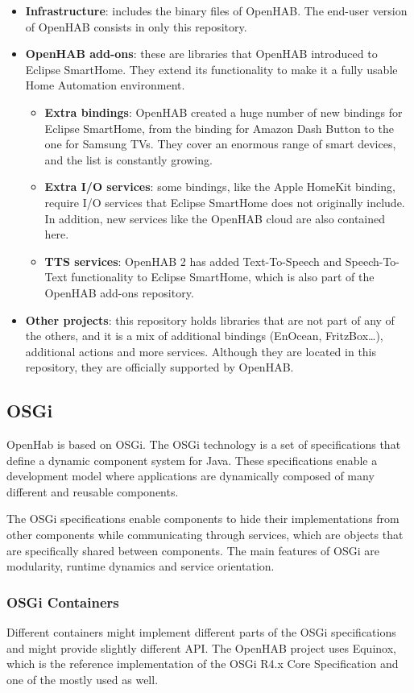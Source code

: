 \begin{itemize}
\begin{itemize}
	\end{itemize}
	\item \textbf{Infrastructure}: includes the binary files of OpenHAB. The end-user version of OpenHAB consists in only this repository.
	\item \textbf{OpenHAB add-ons}: these are libraries that OpenHAB introduced to Eclipse SmartHome. They extend its functionality to
	make it a fully usable Home Automation environment.
	\begin{itemize}
		\item \textbf{Extra bindings}: OpenHAB created a huge number of new bindings for Eclipse SmartHome, from the binding for
		Amazon Dash Button to the one for Samsung TVs. They cover an enormous range of smart devices, and the list is constantly growing.
		\item \textbf{Extra I/O services}: some bindings, like the Apple HomeKit binding, require I/O services that Eclipse SmartHome
		does not originally include. In addition, new services like the OpenHAB cloud are also contained here.
		\item \textbf{TTS services}: OpenHAB 2 has added Text-To-Speech and Speech-To-Text functionality to Eclipse SmartHome, which is
		also part of the OpenHAB add-ons repository.
	\end{itemize}
	\item \textbf{Other projects}: this repository holds libraries that are not part of any of the others, and it is a mix of additional bindings
	(EnOcean, FritzBox…), additional actions and more services. Although they are located in this repository, they are officially supported
	by OpenHAB.
\end{itemize}

\subsection{OSGi}
OpenHab is based on OSGi. The OSGi technology is a set of specifications that define a dynamic component system for Java. These
specifications enable a development model where applications are dynamically composed of many different and reusable components.

The OSGi specifications enable components to hide their implementations from other components while communicating through services,
which are objects that are specifically shared between components.\cite{openHABDocs} The main features of OSGi are modularity,
runtime dynamics and service orientation.

\subsubsection{OSGi Containers}
Different containers might implement different parts of the OSGi specifications and might provide slightly different API. The OpenHAB
project uses Equinox, which is the reference implementation of the OSGi R4.x Core Specification and one of the mostly used as well.

